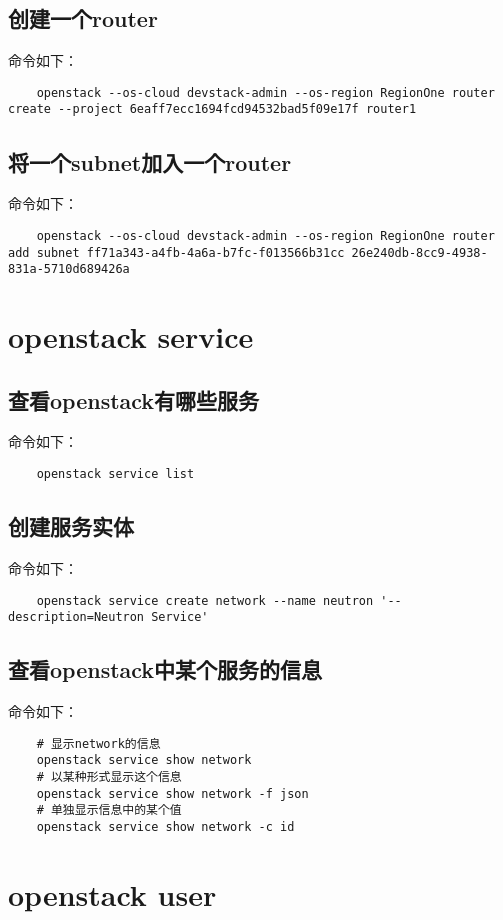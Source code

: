 \documentclass[a4paper,left=1.5cm,right=1.5cm,11pt]{article}
\begin{document}
\subsection{创建一个router}
	命令如下：
	\begin{lstlisting}
	openstack --os-cloud devstack-admin --os-region RegionOne router create --project 6eaff7ecc1694fcd94532bad5f09e17f router1
	\end{lstlisting}

\subsection{将一个subnet加入一个router}
	命令如下：
	\begin{lstlisting}
	openstack --os-cloud devstack-admin --os-region RegionOne router add subnet ff71a343-a4fb-4a6a-b7fc-f013566b31cc 26e240db-8cc9-4938-831a-5710d689426a
	\end{lstlisting}

\section{openstack service}
\subsection{查看openstack有哪些服务}
	命令如下：
	\begin{lstlisting}
	openstack service list
	\end{lstlisting}

\subsection{创建服务实体}
	命令如下：
	\begin{lstlisting}
	openstack service create network --name neutron '--description=Neutron Service'
	\end{lstlisting}
	
\subsection{查看openstack中某个服务的信息}
	命令如下：
	\begin{lstlisting}
	# 显示network的信息
	openstack service show network
	# 以某种形式显示这个信息
	openstack service show network -f json
	# 单独显示信息中的某个值
	openstack service show network -c id
	\end{lstlisting}

\section{openstack user}
\end{document}

